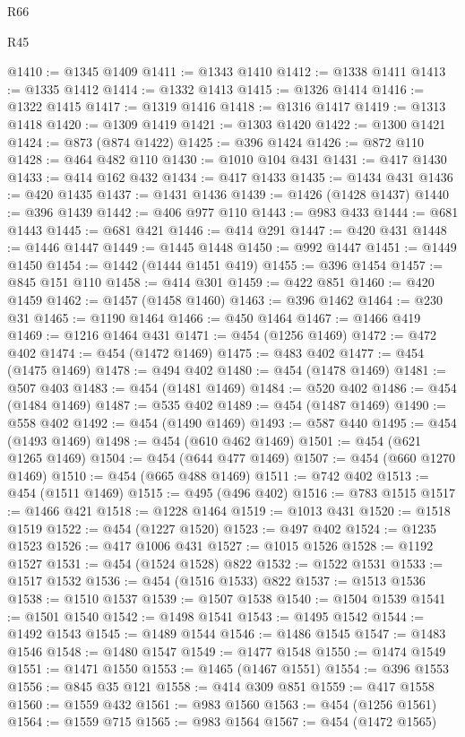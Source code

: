 \begin{lexlean}{R66}
\begin{lexlean}{R45}
\begin{coremodule}
{{{{{{{{{{{{{{{{{{{{{{{{{{{{{{{{{{{{{{{{{{{{{{{{{{{{{{{{{{{{{{{{{{{{{{{{{{{{{{{{{{{{{{{{{{{@1410 := @1345 @1409
@1411 := @1343 @1410
@1412 := @1338 @1411
@1413 := @1335 @1412
@1414 := @1332 @1413
@1415 := @1326 @1414
@1416 := @1322 @1415
@1417 := @1319 @1416
@1418 := @1316 @1417
@1419 := @1313 @1418
@1420 := @1309 @1419
@1421 := @1303 @1420
@1422 := @1300 @1421
@1424 := @873 (@874 @1422)
@1425 := @396 @1424
@1426 := @872 @110
@1428 := @464 @482 @110
@1430 := @1010 @104 @431
@1431 := @417 @1430
@1433 := @414 @162 @432
@1434 := @417 @1433
@1435 := @1434 @431
@1436 := @420 @1435
@1437 := @1431 @1436
@1439 := @1426 (@1428 @1437)
@1440 := @396 @1439
@1442 := @406 @977 @110
@1443 := @983 @433
@1444 := @681 @1443
@1445 := @681 @421
@1446 := @414 @291
@1447 := @420 @431
@1448 := @1446 @1447
@1449 := @1445 @1448
@1450 := @992 @1447
@1451 := @1449 @1450
@1454 := @1442 (@1444 @1451 @419)
@1455 := @396 @1454
@1457 := @845 @151 @110
@1458 := @414 @301
@1459 := @422 @851
@1460 := @420 @1459
@1462 := @1457 (@1458 @1460)
@1463 := @396 @1462
@1464 := @230 @31
@1465 := @1190 @1464
@1466 := @450 @1464
@1467 := @1466 @419
@1469 := @1216 @1464 @431
@1471 := @454 (@1256 @1469)
@1472 := @472 @402
@1474 := @454 (@1472 @1469)
@1475 := @483 @402
@1477 := @454 (@1475 @1469)
@1478 := @494 @402
@1480 := @454 (@1478 @1469)
@1481 := @507 @403
@1483 := @454 (@1481 @1469)
@1484 := @520 @402
@1486 := @454 (@1484 @1469)
@1487 := @535 @402
@1489 := @454 (@1487 @1469)
@1490 := @558 @402
@1492 := @454 (@1490 @1469)
@1493 := @587 @440
@1495 := @454 (@1493 @1469)
@1498 := @454 (@610 @462 @1469)
@1501 := @454 (@621 @1265 @1469)
@1504 := @454 (@644 @477 @1469)
@1507 := @454 (@660 @1270 @1469)
@1510 := @454 (@665 @488 @1469)
@1511 := @742 @402
@1513 := @454 (@1511 @1469)
@1515 := @495 (@496 @402)
@1516 := @783 @1515
@1517 := @1466 @421
@1518 := @1228 @1464
@1519 := @1013 @431
@1520 := @1518 @1519
@1522 := @454 (@1227 @1520)
@1523 := @497 @402
@1524 := @1235 @1523
@1526 := @417 @1006 @431
@1527 := @1015 @1526
@1528 := @1192 @1527
@1531 := @454 (@1524 @1528) @822
@1532 := @1522 @1531
@1533 := @1517 @1532
@1536 := @454 (@1516 @1533) @822
@1537 := @1513 @1536
@1538 := @1510 @1537
@1539 := @1507 @1538
@1540 := @1504 @1539
@1541 := @1501 @1540
@1542 := @1498 @1541
@1543 := @1495 @1542
@1544 := @1492 @1543
@1545 := @1489 @1544
@1546 := @1486 @1545
@1547 := @1483 @1546
@1548 := @1480 @1547
@1549 := @1477 @1548
@1550 := @1474 @1549
@1551 := @1471 @1550
@1553 := @1465 (@1467 @1551)
@1554 := @396 @1553
@1556 := @845 @35 @121
@1558 := @414 @309 @851
@1559 := @417 @1558
@1560 := @1559 @432
@1561 := @983 @1560
@1563 := @454 (@1256 @1561)
@1564 := @1559 @715
@1565 := @983 @1564
@1567 := @454 (@1472 @1565)
}}}}}}}}}}}}}}}}}}}}}}}}}}}}}}}}}}}}}}}}}}}}}}}}}}}}}}}}}}}}}}}}}}}}}}}}}}}}}}}}}}}}}}}}}}}
\end{coremodule}
\end{lexlean}
\end{lexlean}
